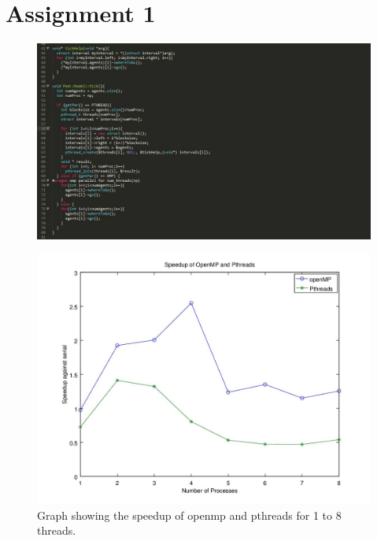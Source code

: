 \documentclass{beamer}
\title[Crisis] %
{}
\author[]{\small Markus Palacios \\ \emph{markus.palacios.5737@student.uu.se} \\ \and Jonathan Sharyari \\ \emph{jonathan.sharyari.0152@student.uu.se} \\  Peng Sun\\\emph{peng.sun.8197@student.uu.se}}
\subtitle{Project Presentation}
\date[2015-03-13] %
{March $13^{th}$, 2015}
\institute[Dept. of Information Technology] %
{
	Department of Information Technology\\
		Uppsala University
}
\begin{document}
\begin{frame}[plain]
\titlepage
\end{frame}

\section{Assignment 1}
\begin{frame}
	\begin{figure}[h!]
	\includegraphics[width=\textwidth]{code.jpg}
	\end{figure}
\end{frame}

\begin{frame}
	\begin{figure}[h!]
	\includegraphics[width=\textwidth]{lab1graph.jpg}
	\caption{Graph showing the speedup of openmp and pthreads for 1 to 8 threads.}
	\end{figure}
\end{frame}
\end{document}
